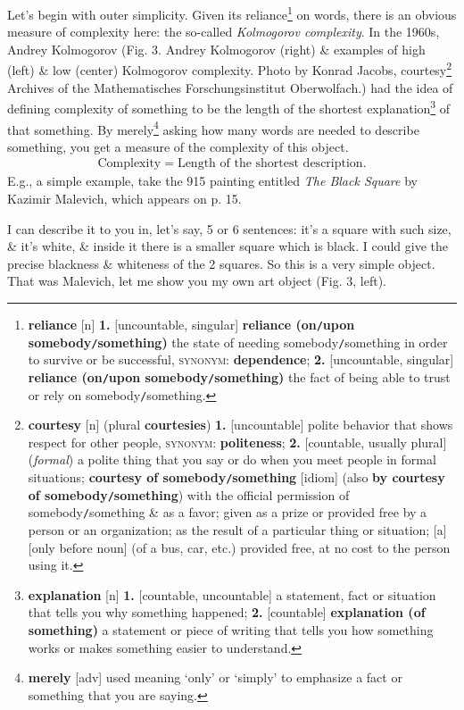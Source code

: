 \documentclass[oneside]{book}
\numberwithin{equation}{section}
\begin{document}
Let's begin with outer simplicity. Given its reliance\footnote{\textbf{reliance} [n] \textbf{1.} [uncountable, singular] \textbf{reliance (on\texttt{/}upon somebody\texttt{/}something)} the state of needing somebody\texttt{/}something in order to survive or be successful, \textsc{synonym}: \textbf{dependence}; \textbf{2.} [uncountable, singular] \textbf{reliance (on\texttt{/}upon somebody\texttt{/}something)} the fact of being able to trust or rely on somebody\texttt{/}something.} on words, there is an obvious measure of complexity here: the so-called \textit{Kolmogorov complexity}. In the 1960s, Andrey Kolmogorov (\textsf{Fig. 3. Andrey Kolmogorov (right) \& examples of high (left) \& low (center) Kolmogorov complexity. Photo by Konrad Jacobs, courtesy\footnote{\textbf{courtesy} [n] (plural \textbf{courtesies}) \textbf{1.} [uncountable] polite behavior that shows respect for other people, \textsc{synonym}: \textbf{politeness}; \textbf{2.} [countable, usually plural] (\textit{formal}) a polite thing that you say or do when you meet people in formal situations; \textbf{courtesy of somebody\texttt{/}something} [idiom] (also \textbf{by courtesy of somebody\texttt{/}something}) with the official permission of somebody\texttt{/}something \& as a favor; given as a prize or provided free by a person or an organization; as the result of a particular thing or situation; [a] [only before noun] (of a bus, car, etc.) provided free, at no cost to the person using it.} Archives of the Mathematisches Forschungsinstitut Oberwolfach.}) had the idea of defining complexity of something to be the length of the shortest explanation\footnote{\textbf{explanation} [n] \textbf{1.} [countable, uncountable] a statement, fact or situation that tells you why something happened; \textbf{2.} [countable] \textbf{explanation (of something)} a statement or piece of writing that tells you how something works or makes something easier to understand.} of that something. By merely\footnote{\textbf{merely} [adv] used meaning `only' or `simply' to emphasize a fact or something that you are saying.} asking how many words are needed to describe something, you get a measure of the complexity of this object.
\begin{align*}
	\mbox{Complexity}=\mbox{Length of the shortest description}.
\end{align*}
E.g., a simple example, take the 915 painting entitled \textit{The Black Square} by Kazimir Malevich, which appears on p. 15.

I can describe it to you in, let's say, 5 or 6 sentences: it's a square with such size, \& it's white, \& inside it there is a smaller square which is black. I could give the precise blackness \& whiteness of the 2 squares. So this is a very simple object. That was Malevich, let me show you my own art object (Fig. 3, left).
\end{document}
